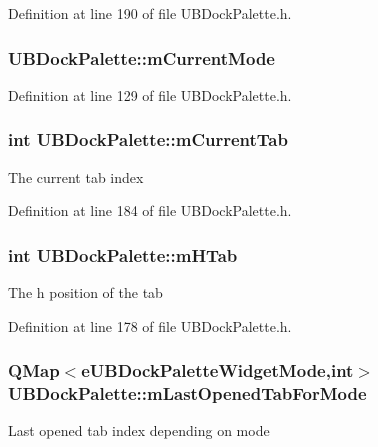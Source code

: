 Definition at line 190 of file U\-B\-Dock\-Palette.\-h.

\hypertarget{class_u_b_dock_palette_a32701f18f9d1f1b31c568fc0349632c5}{
\subsubsection[{m\-Current\-Mode}]{ U\-B\-Dock\-Palette\-::m\-Current\-Mode}}\label{dc/d54/class_u_b_dock_palette_a32701f18f9d1f1b31c568fc0349632c5}


Definition at line 129 of file U\-B\-Dock\-Palette.\-h.

\hypertarget{class_u_b_dock_palette_a5a410c0bb7ca9aee7698b2f055adf600}{
\subsubsection[{m\-Current\-Tab}]{\setlength{\rightskip}{0pt plus 5cm}int U\-B\-Dock\-Palette\-::m\-Current\-Tab\hspace{0.3cm}{\ttfamily [protected]}}}\label{dc/d54/class_u_b_dock_palette_a5a410c0bb7ca9aee7698b2f055adf600}
The current tab index 

Definition at line 184 of file U\-B\-Dock\-Palette.\-h.

\hypertarget{class_u_b_dock_palette_a4dd61dbf2e05e83fc8b04474741824fb}{
\subsubsection[{m\-H\-Tab}]{\setlength{\rightskip}{0pt plus 5cm}int U\-B\-Dock\-Palette\-::m\-H\-Tab\hspace{0.3cm}{\ttfamily [protected]}}}\label{dc/d54/class_u_b_dock_palette_a4dd61dbf2e05e83fc8b04474741824fb}
The h position of the tab 

Definition at line 178 of file U\-B\-Dock\-Palette.\-h.

\hypertarget{class_u_b_dock_palette_afb8107764021a65434ec4424e9ffdb94}{
\subsubsection[{m\-Last\-Opened\-Tab\-For\-Mode}]{\setlength{\rightskip}{0pt plus 5cm}Q\-Map$<${\bf e\-U\-B\-Dock\-Palette\-Widget\-Mode},int$>$ U\-B\-Dock\-Palette\-::m\-Last\-Opened\-Tab\-For\-Mode\hspace{0.3cm}{\ttfamily [protected]}}}\label{dc/d54/class_u_b_dock_palette_afb8107764021a65434ec4424e9ffdb94}
Last opened tab index depending on mode 

